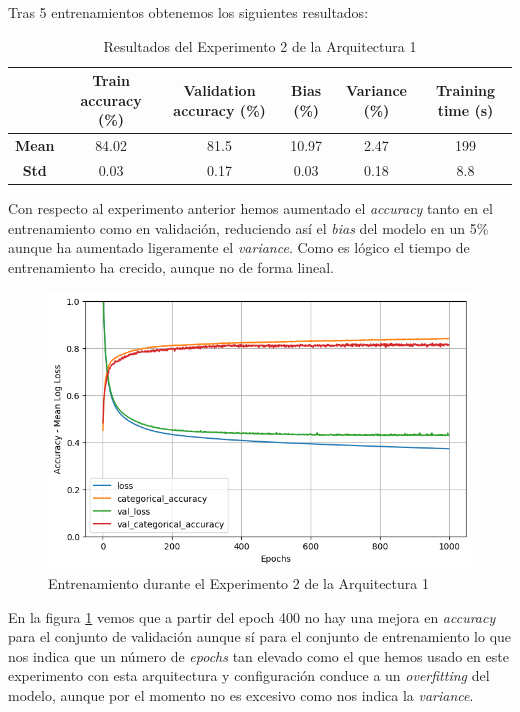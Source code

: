 \documentclass{article}
\begin{document}
			Tras 5 entrenamientos obtenemos los siguientes resultados:
			\begin{table}[!h]
				\begin{center}
					\begin{tabular}{ c | c | c | c | c | c |}
						\ & \textbf{Train accuracy (\%)} & \textbf{Validation accuracy (\%)} & \textbf{Bias (\%)} & \textbf{Variance (\%)} & \textbf{Training time (s)} \\ \hline
						\textbf{Mean} & 84.02 & 81.5 & 10.97 & 2.47 & 199\\ \hline
						\textbf{Std} & 0.03 & 0.17 & 0.03 & 0.18 & 8.8 \\ \hline
					\end{tabular}
					\caption{Resultados del Experimento 2 de la Arquitectura 1}
					\label{tab:res-a1-e2}
				\end{center}
			\end{table}
			Con respecto al experimento anterior hemos aumentado el \textit{accuracy} tanto en el entrenamiento como en validaci\'on, reduciendo as\'i el \textit{bias} del modelo en un 5\% aunque ha aumentado ligeramente el \textit{variance}. Como es l\'ogico el tiempo de entrenamiento ha crecido, aunque no de forma lineal.\\
			\begin{figure}[!h]
				\begin{center}
					\includegraphics[scale=0.5]{tr-a1-e2.png}		
					\caption{Entrenamiento durante el Experimento 2 de la Arquitectura 1}	
					\label{tr-a1-e2}
				\end{center}
			\end{figure}
			En la figura \ref{tr-a1-e2} vemos que a partir del epoch 400 no hay una mejora en \textit{accuracy} para el conjunto de validaci\'on aunque s\'i para el conjunto de entrenamiento lo que nos indica que un n\'umero de \textit{epochs} tan elevado como el que hemos usado en este experimento con esta arquitectura y configuraci\'on conduce a un \textit{overfitting} del modelo, aunque por el momento no es excesivo como nos indica la \textit{variance}.
			
\end{document}
